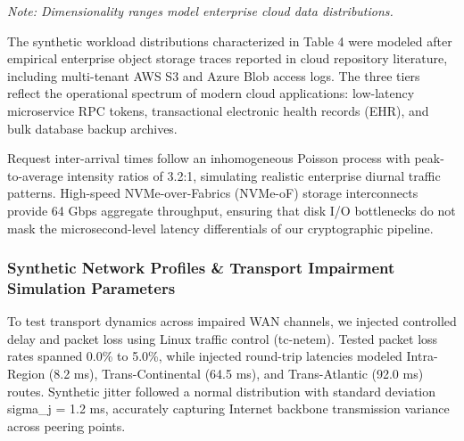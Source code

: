 \documentclass[5p,times]{elsarticle}
\begin{document}
\begin{table}[!ht]
  \centering
  \caption{Synthetic Workload Characteristics and Dimensionality Profiles}
  \vspace{2pt}
  \par\raggedright\footnotesize\textit{\textit{Note:} Dimensionality ranges model enterprise cloud data distributions.}
\end{table}

The synthetic workload distributions characterized in Table 4 were modeled after empirical enterprise object storage traces reported in cloud repository literature, including multi-tenant AWS S3 and Azure Blob access logs. The three tiers reflect the operational spectrum of modern cloud applications: low-latency microservice RPC tokens, transactional electronic health records (EHR), and bulk database backup archives.

Request inter-arrival times follow an inhomogeneous Poisson process with peak-to-average intensity ratios of 3.2:1, simulating realistic enterprise diurnal traffic patterns. High-speed NVMe-over-Fabrics (NVMe-oF) storage interconnects provide 64 Gbps aggregate throughput, ensuring that disk I/O bottlenecks do not mask the microsecond-level latency differentials of our cryptographic pipeline.


\subsubsection{Synthetic Network Profiles \& Transport Impairment Simulation Parameters}

To test transport dynamics across impaired WAN channels, we injected controlled delay and packet loss using Linux traffic control (tc-netem). Tested packet loss rates spanned 0.0\% to 5.0\%, while injected round-trip latencies modeled Intra-Region (8.2 ms), Trans-Continental (64.5 ms), and Trans-Atlantic (92.0 ms) routes. Synthetic jitter followed a normal distribution with standard deviation sigma\_j = 1.2 ms, accurately capturing Internet backbone transmission variance across peering points.
\end{document}
